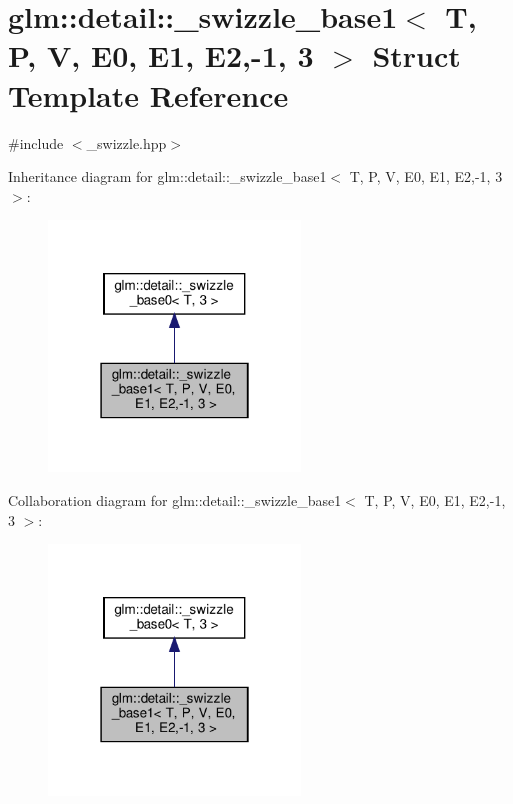 \hypertarget{structglm_1_1detail_1_1__swizzle__base1_3_01_t_00_01_p_00_01_v_00_01_e0_00_01_e1_00_01_e2_00-1_00_013_01_4}{}\section{glm\+:\+:detail\+:\+:\+\_\+swizzle\+\_\+base1$<$ T, P, V, E0, E1, E2,-\/1, 3 $>$ Struct Template Reference}
\label{structglm_1_1detail_1_1__swizzle__base1_3_01_t_00_01_p_00_01_v_00_01_e0_00_01_e1_00_01_e2_00-1_00_013_01_4}


{\ttfamily \#include $<$\+\_\+swizzle.\+hpp$>$}



Inheritance diagram for glm\+:\+:detail\+:\+:\+\_\+swizzle\+\_\+base1$<$ T, P, V, E0, E1, E2,-\/1, 3 $>$\+:\nopagebreak
\begin{figure}[H]
\begin{center}
\leavevmode
\includegraphics[width=190pt]{structglm_1_1detail_1_1__swizzle__base1_3_01_t_00_01_p_00_01_v_00_01_e0_00_01_e1_00_01_e2_00-1_00_013_01_4__inherit__graph}
\end{center}
\end{figure}


Collaboration diagram for glm\+:\+:detail\+:\+:\+\_\+swizzle\+\_\+base1$<$ T, P, V, E0, E1, E2,-\/1, 3 $>$\+:\nopagebreak
\begin{figure}[H]
\begin{center}
\leavevmode
\includegraphics[width=190pt]{structglm_1_1detail_1_1__swizzle__base1_3_01_t_00_01_p_00_01_v_00_01_e0_00_01_e1_00_01_e2_00-1_00_013_01_4__coll__graph}
\end{center}
\end{figure}
